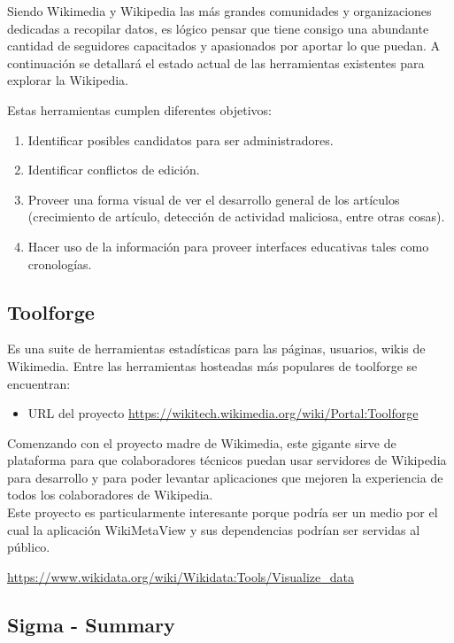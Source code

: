 Siendo Wikimedia y Wikipedia las más grandes comunidades y organizaciones dedicadas a recopilar datos, es lógico pensar que tiene consigo una abundante cantidad de seguidores capacitados y apasionados por aportar lo que puedan. A continuación se detallará el estado actual de las herramientas existentes para explorar la Wikipedia.

Estas herramientas cumplen diferentes objetivos:

\begin{enumerate}
    \item Identificar posibles candidatos para ser administradores.
    \item Identificar conflictos de edición.
    \item Proveer una forma visual de ver el desarrollo general de los artículos (crecimiento de artículo, detección de actividad maliciosa, entre otras cosas).
    \item Hacer uso de la información para proveer interfaces educativas tales como cronologías.
\end{enumerate}


\subsection{Toolforge}

Es una suite de herramientas estadísticas para las páginas, usuarios, wikis de Wikimedia. Entre las herramientas hosteadas más populares de toolforge se encuentran:

\begin{itemize}
    \item URL del proyecto \url{https://wikitech.wikimedia.org/wiki/Portal:Toolforge}
\end{itemize}

Comenzando con el proyecto madre de Wikimedia, este gigante sirve de plataforma para que colaboradores técnicos puedan usar servidores de Wikipedia para desarrollo y para poder levantar aplicaciones que mejoren la experiencia de todos los colaboradores de Wikipedia.
\\
Este proyecto es particularmente interesante porque podría ser un medio por el cual la aplicación WikiMetaView y sus dependencias podrían ser servidas al público.

\url{https://www.wikidata.org/wiki/Wikidata:Tools/Visualize_data}

\subsection{Sigma - Summary}

